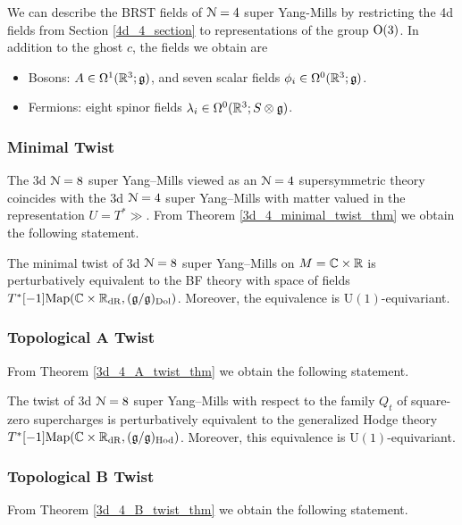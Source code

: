\documentclass[10pt, oneside]{article}
\renewcommand{\U}{\mathrm{U}}
\begin{document}
 We can describe the BRST fields of $\mathcal{N}=4$ super Yang-Mills by restricting the 4d fields from Section \ref{4d_4_section} to representations of the group $\mathrm{O}(3)$.  In addition to the ghost $c$, the fields we obtain are
\begin{itemize}
 \item Bosons: $A \in \Omega^1(\mathbb R^3; \mathfrak{g})$, and seven scalar fields $\phi_i \in \Omega^0(\mathbb R^3; \mathfrak{g})$.
 \item Fermions: eight spinor fields $\lambda_i \in \Omega^0(\mathbb R^3; S \otimes \mathfrak{g})$.
\end{itemize}

\subsubsection{Minimal Twist}
\label{sect:3d_8_minimal_twist}
The 3d $\mathcal N=8$ super Yang--Mills viewed as an $\mathcal N=4$ supersymmetric theory coincides with the 3d $\mathcal N=4$ super Yang--Mills with matter valued in the representation $U = T^*\gg$. From Theorem \ref{3d_4_minimal_twist_thm} we obtain the following statement.

\begin{theorem} 
The minimal twist of 3d $\mathcal N=8$ super Yang--Mills on $M=\mathbb C\times \mathbb R$ is perturbatively equivalent to the BF theory with space of fields $T^*[-1]\mathrm{Map}(\mathbb C \times \mathbb R_{\mathrm{dR}}, (\mathfrak{g}/\mathfrak{g})_{\mathrm{Dol}})$. Moreover, the equivalence is $\U(1)$-equivariant.
\end{theorem}

\subsubsection{Topological A Twist}
\label{sect:3d_8_A_Twist}
From Theorem \ref{3d_4_A_twist_thm} we obtain the following statement.

\begin{theorem} 
The twist of 3d $\mathcal N=8$ super Yang--Mills with respect to the family $Q_t$ of square-zero supercharges is perturbatively equivalent to the generalized Hodge theory $T^*[-1]\mathrm{Map}(\mathbb C \times \mathbb R_{\mathrm{dR}}, (\mathfrak{g}/\mathfrak{g})_{\mathrm{Hod}})$. Moreover, this equivalence is $\U(1)$-equivariant.
\end{theorem}

\subsubsection{Topological B Twist}
\label{sect:3d_8_B_Twist}
From Theorem \ref{3d_4_B_twist_thm} we obtain the following statement.
\end{document}
